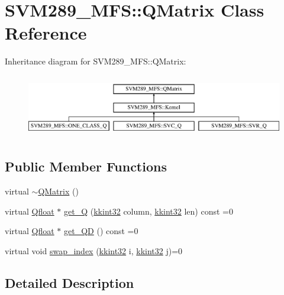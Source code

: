 \hypertarget{class_s_v_m289___m_f_s_1_1_q_matrix}{}\section{S\+V\+M289\+\_\+\+M\+FS\+:\+:Q\+Matrix Class Reference}
\label{class_s_v_m289___m_f_s_1_1_q_matrix}
Inheritance diagram for S\+V\+M289\+\_\+\+M\+FS\+:\+:Q\+Matrix\+:\begin{figure}[H]
\begin{center}
\leavevmode
\includegraphics[height=2.786070cm]{class_s_v_m289___m_f_s_1_1_q_matrix}
\end{center}
\end{figure}
\subsection*{Public Member Functions}
\begin{DoxyCompactItemize}
\item 
virtual \hyperlink{class_s_v_m289___m_f_s_1_1_q_matrix_a337f608b4c4e4ada5b35caf69cd23316}{$\sim$\+Q\+Matrix} ()
\item 
virtual \hyperlink{namespace_s_v_m289___m_f_s_a440663a1b8d42bc10329401883645ae1}{Qfloat} $\ast$ \hyperlink{class_s_v_m289___m_f_s_1_1_q_matrix_a80b3d1ac0e040add9b39ff77f8383ddd}{get\+\_\+Q} (\hyperlink{namespace_k_k_b_a8fa4952cc84fda1de4bec1fbdd8d5b1b}{kkint32} column, \hyperlink{namespace_k_k_b_a8fa4952cc84fda1de4bec1fbdd8d5b1b}{kkint32} len) const  =0
\item 
virtual \hyperlink{namespace_s_v_m289___m_f_s_a440663a1b8d42bc10329401883645ae1}{Qfloat} $\ast$ \hyperlink{class_s_v_m289___m_f_s_1_1_q_matrix_a34d6786fdea3ad567a648cba4c0f8fe8}{get\+\_\+\+QD} () const  =0
\item 
virtual void \hyperlink{class_s_v_m289___m_f_s_1_1_q_matrix_a40288a65c5bf829f671a7722a36f101e}{swap\+\_\+index} (\hyperlink{namespace_k_k_b_a8fa4952cc84fda1de4bec1fbdd8d5b1b}{kkint32} i, \hyperlink{namespace_k_k_b_a8fa4952cc84fda1de4bec1fbdd8d5b1b}{kkint32} j)=0
\end{DoxyCompactItemize}


\subsection{Detailed Description}


